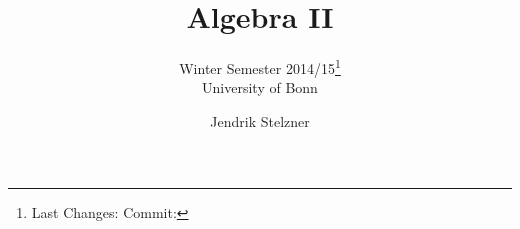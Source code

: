 \documentclass[a4paper, 10pt, oneside, openany,  bibliography=totocnumbered]{scrbook}
\begin{document}
\subject{Notes for}
\title{Algebra II}
\subtitle{
  Winter Semester 2014/15\footnote{
    Last Changes: \texttt{\gitAuthorDate}
    \hfill
    Commit: \texttt{\gitAbbrevHash}
  }
  \\
  University of Bonn
}
\author{Jendrik Stelzner}
\date{}
\publishers{
  Online available at \texttt{\url{https://github.com/cionx/algebra-2-notes-ws-14-15}.}
  \\
  Please send comments and corrections at \texttt{\href{mailto:stelzner@uni-bonn.de}{stelzner@uni-bonn.de}.}
}

\frontmatter
\maketitle
\tableofcontents


\mainmatter





\backmatter


\end{document}
